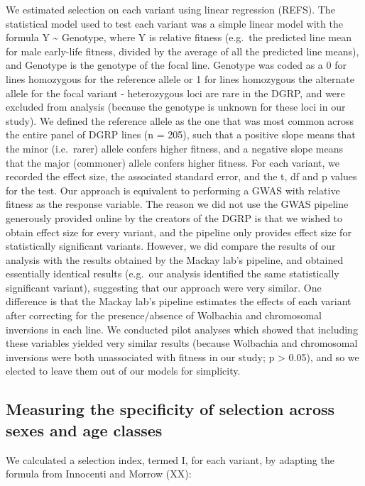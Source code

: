 \documentclass{article}
\begin{document}
We estimated selection on each variant using linear regression (REFS).
The statistical model used to test each variant was a simple linear
model with the formula Y \textasciitilde{} Genotype, where Y is relative
fitness (e.g.~the predicted line mean for male early-life fitness,
divided by the average of all the predicted line means), and Genotype is
the genotype of the focal line. Genotype was coded as a 0 for lines
homozygous for the reference allele or 1 for lines homozygous the
alternate allele for the focal variant - heterozygous loci are rare in
the DGRP, and were excluded from analysis (because the genotype is
unknown for these loci in our study). We defined the reference allele as
the one that was most common across the entire panel of DGRP lines (n =
205), such that a positive slope means that the minor (i.e.~rarer)
allele confers higher fitness, and a negative slope means that the major
(commoner) allele confers higher fitness. For each variant, we recorded
the effect size, the associated standard error, and the t, df and p
values for the test. Our approach is equivalent to performing a GWAS
with relative fitness as the response variable. The reason we did not
use the GWAS pipeline generously provided online by the creators of the
DGRP is that we wished to obtain effect size for every variant, and the
pipeline only provides effect size for statistically significant
variants. However, we did compare the results of our analysis with the
results obtained by the Mackay lab's pipeline, and obtained essentially
identical results (e.g.~our analysis identified the same statistically
significant variant), suggesting that our approach were very similar.
One difference is that the Mackay lab's pipeline estimates the effects
of each variant after correcting for the presence/absence of Wolbachia
and chromosomal inversions in each line. We conducted pilot analyses
which showed that including these variables yielded very similar results
(because Wolbachia and chromosomal inversions were both unassociated
with fitness in our study; p \textgreater{} 0.05), and so we elected to
leave them out of our models for simplicity.

\subsection*{Measuring the specificity of selection across sexes and age classes}

We calculated a selection index, termed I, for each variant, by adapting
the formula from Innocenti and Morrow (XX):
\end{document}
